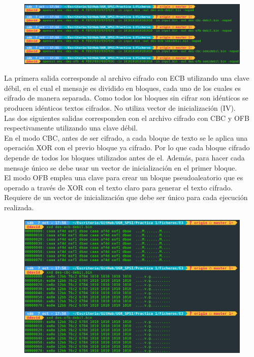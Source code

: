 \documentclass[10pt,a4paper,spanish]{report}
\begin{document}
\begin{figure}[!hbp]
 \centering  \includegraphics[width=1\textwidth]{./Imagenes/5.png}
\end{figure}

\newpage
\noindent
La primera salida corresponde al archivo cifrado con ECB utilizando una clave débil, en el cual el mensaje es dividido en bloques, cada uno de los cuales es cifrado de manera separada. Como todos los bloques sin cifrar son idénticos se producen idénticos textos cifrados. No utiliza vector de inicialización (IV). \\

\noindent
Las dos siguientes salidas corresponden con el archivo cifrado con CBC y OFB respectivamente utilizando una clave débil.\\

\noindent
En el modo CBC, antes de ser cifrado, a cada bloque de texto se le aplica una operación XOR con el previo bloque ya cifrado. Por lo que cada bloque cifrado depende de todos los bloques utilizados antes de el. Además, para hacer cada mensaje único se debe usar un vector de inicialización en el primer bloque.\\

\noindent
El modo OFB emplea una clave para crear un bloque pseudoaleatorio que es operado a través de XOR con el texto claro para generar el texto cifrado. Requiere de un vector de inicialización que debe ser único para cada ejecución realizada.

\begin{figure}[!hbp]
 \centering  \includegraphics[width=1\textwidth]{./Imagenes/6.png}
\end{figure}
\end{document}
